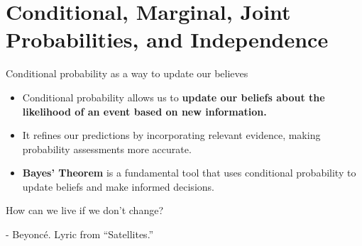 \documentclass[aspectratio=169]{beamer}
\begin{document}
\section{\large Conditional, Marginal, Joint Probabilities, and Independence}

\begin{frame}{Conditional probability as a way to update our believes}
    
    
    \begin{itemize}
        \item Conditional probability allows us to \textbf{update our beliefs about the likelihood of an event based on new information.}
        \item It refines our predictions by incorporating relevant evidence, making probability assessments more accurate.
        \item \textbf{Bayes' Theorem} is a fundamental tool that uses conditional probability to update beliefs and make informed decisions.
    \end{itemize}
    
    \vspace{0.3cm}
    
    \begin{center}
        \begin{tcolorbox}[enhanced,sharp corners,
            width=7.3cm,
            colback=white,
            overlay={
                \node[anchor=north west,fill=white,draw=white,circle,inner sep=1pt] 
                at ([xshift=-0.17cm,yshift=0.2cm]frame.north west) {\faQuoteLeft};
                \node[anchor=south east,fill=white,draw=white,circle,inner sep=1pt] 
                at ([xshift=0.17cm,yshift=-0.2cm]frame.south east) {\faQuoteRight};
            }
            ]
            How can we live if we don’t change?
            \vspace{0cm}
            
            {\small - Beyoncé. Lyric from “Satellites.”}
        \end{tcolorbox}
    \end{center}
        
\end{frame}
\end{document}
